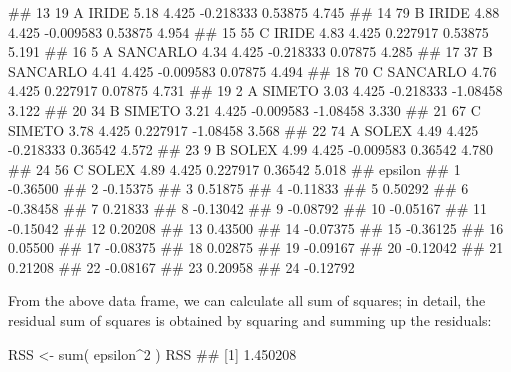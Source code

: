\documentclass[a4paper,12pt,oneside]{book}
\newenvironment{Shaded}{\begin{snugshade}}{\end{snugshade}}
\newcommand{\DecValTok}[1]{#1}
\newcommand{\SpecialCharTok}[1]{#1}
\newcommand{\DocumentationTok}[1]{#1}
\newcommand{\OtherTok}[1]{#1}
\newcommand{\FunctionTok}[1]{#1}
\newcommand{\NormalTok}[1]{#1}
\begin{document}
\begin{Shaded}
\begin{Highlighting}[]
\DocumentationTok{\#\# 13   19     A    IRIDE  5.18 4.425 {-}0.218333  0.53875 4.745}
\DocumentationTok{\#\# 14   79     B    IRIDE  4.88 4.425 {-}0.009583  0.53875 4.954}
\DocumentationTok{\#\# 15   55     C    IRIDE  4.83 4.425  0.227917  0.53875 5.191}
\DocumentationTok{\#\# 16    5     A SANCARLO  4.34 4.425 {-}0.218333  0.07875 4.285}
\DocumentationTok{\#\# 17   37     B SANCARLO  4.41 4.425 {-}0.009583  0.07875 4.494}
\DocumentationTok{\#\# 18   70     C SANCARLO  4.76 4.425  0.227917  0.07875 4.731}
\DocumentationTok{\#\# 19    2     A   SIMETO  3.03 4.425 {-}0.218333 {-}1.08458 3.122}
\DocumentationTok{\#\# 20   34     B   SIMETO  3.21 4.425 {-}0.009583 {-}1.08458 3.330}
\DocumentationTok{\#\# 21   67     C   SIMETO  3.78 4.425  0.227917 {-}1.08458 3.568}
\DocumentationTok{\#\# 22   74     A    SOLEX  4.49 4.425 {-}0.218333  0.36542 4.572}
\DocumentationTok{\#\# 23    9     B    SOLEX  4.99 4.425 {-}0.009583  0.36542 4.780}
\DocumentationTok{\#\# 24   56     C    SOLEX  4.89 4.425  0.227917  0.36542 5.018}
\DocumentationTok{\#\#     epsilon}
\DocumentationTok{\#\# 1  {-}0.36500}
\DocumentationTok{\#\# 2  {-}0.15375}
\DocumentationTok{\#\# 3   0.51875}
\DocumentationTok{\#\# 4  {-}0.11833}
\DocumentationTok{\#\# 5   0.50292}
\DocumentationTok{\#\# 6  {-}0.38458}
\DocumentationTok{\#\# 7   0.21833}
\DocumentationTok{\#\# 8  {-}0.13042}
\DocumentationTok{\#\# 9  {-}0.08792}
\DocumentationTok{\#\# 10 {-}0.05167}
\DocumentationTok{\#\# 11 {-}0.15042}
\DocumentationTok{\#\# 12  0.20208}
\DocumentationTok{\#\# 13  0.43500}
\DocumentationTok{\#\# 14 {-}0.07375}
\DocumentationTok{\#\# 15 {-}0.36125}
\DocumentationTok{\#\# 16  0.05500}
\DocumentationTok{\#\# 17 {-}0.08375}
\DocumentationTok{\#\# 18  0.02875}
\DocumentationTok{\#\# 19 {-}0.09167}
\DocumentationTok{\#\# 20 {-}0.12042}
\DocumentationTok{\#\# 21  0.21208}
\DocumentationTok{\#\# 22 {-}0.08167}
\DocumentationTok{\#\# 23  0.20958}
\DocumentationTok{\#\# 24 {-}0.12792}
\end{Highlighting}
\end{Shaded}

\normalsize

From the above data frame, we can calculate all sum of squares; in detail, the residual sum of squares is obtained by squaring and summing up the residuals:

\vspace{12pt}

\begin{Shaded}
\begin{Highlighting}[]
\NormalTok{RSS }\OtherTok{\textless{}{-}} \FunctionTok{sum}\NormalTok{( epsilon}\SpecialCharTok{\^{}}\DecValTok{2}\NormalTok{ )}
\NormalTok{RSS}
\DocumentationTok{\#\# [1] 1.450208}
\end{Highlighting}
\end{Shaded}
\end{document}
